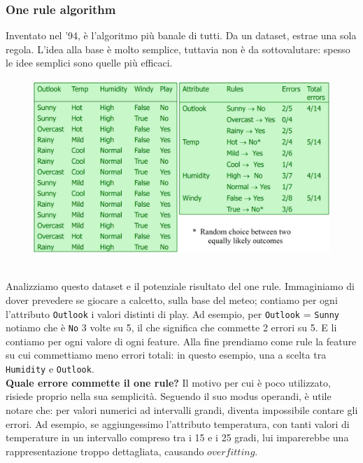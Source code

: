 \subsubsection{One rule algorithm}
Inventato nel '94, è l'algoritmo più banale di tutti. Da un dataset, estrae una sola regola. L'idea alla base è molto semplice, tuttavia non è da sottovalutare: spesso le idee semplici sono quelle più efficaci.
\\
\begin{figure}[th]
    \centering
    \includegraphics[scale=0.5]{ML/img/onerule.png}
\end{figure}
\\
Analizziamo questo dataset e il potenziale risultato del one rule. Immaginiamo di dover prevedere se giocare a calcetto, sulla base del meteo; contiamo per ogni l'attributo \texttt{Outlook} i valori distinti di play. Ad esempio, per \texttt{Outlook} = \texttt{Sunny} notiamo che è \texttt{No} 3 volte su 5, il che significa che commette 2 errori su 5. E li contiamo per ogni valore di ogni feature. Alla fine prendiamo come rule la feature su cui commettiamo meno errori totali: in questo esempio, una a scelta tra \texttt{Humidity} e \texttt{Outlook}.
\\
\textbf{Quale errore commette il one rule?} Il motivo per cui è poco utilizzato, risiede proprio nella sua semplicità. Seguendo il suo modus operandi, è utile notare che: per valori numerici ad intervalli grandi, diventa impossibile contare gli errori. Ad esempio, se aggiungessimo l'attributo temperatura, con tanti valori di temperature in un intervallo compreso tra i 15 e i 25 gradi, lui imparerebbe una rappresentazione troppo dettagliata, causando $overfitting$.

\newpage


